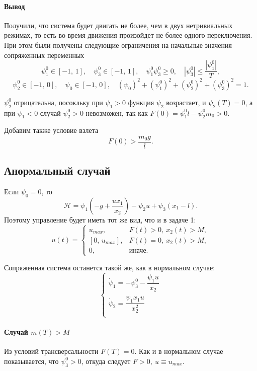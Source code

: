 \documentclass[16pt]{article}
\begin{document}
\paragraph{Вывод} Получили, что система будет двигать не более, чем в двух нетривиальных режимах, то есть
во время движения произойдет не более одного переключения. При этом были получены следующие ограничения на
начальные значения сопряженных переменных
\begin{equation} \label{restr}
\psi_1^0 \in [-1,\, 1], \quad \psi_3^0 \in [-1,\,1],\quad \psi_1^0\psi_3^0 \geqslant 0, 
\quad |\psi_3^0| \leqslant \dfrac{|\psi_1^0|}{T},
\end{equation}
$$\psi_2^0 \in [-1,\, 0], \quad \psi_0 \in [-1,\,0], \quad(\psi_0)^2 + (\psi_1^0)^2 + (\psi_2^0)^2 + (\psi_3^0)^2=1.$$

$\psi_2^0$ отрицательна, посокльку при $\psi_1 > 0$ функция $\psi_2$ возрастает, и $\psi_2(T) = 0$, а при
$\psi_1 < 0$ случай $\psi_2^0 > 0$ невозможен, так как $F(0) = \psi_1^0l - \psi_2^0m_0 > 0$.

Добавим также условие взлета
$$F(0) > \dfrac{m_0g}{l}.$$
\subsection{Анормальный случай}
Если $\psi_0 = 0$, то
$$\mathcal{H} = \psi_1(-g + \dfrac{ux_1}{x_2}) - \psi_2u + \psi_3(x_1-l).$$
Поэтому управление будет иметь тот же вид, что и в задаче 1:
 \begin{equation} \label{oc_1}
 u(t) = 
 \begin{cases}
 u_{max}, & F(t) > 0,\  x_2(t) > M, \\
 [0,\, u_{max}], & F(t) = 0, \ x_2(t) > M, \\
 0, &\text{иначе.}
 \end{cases}
 \end{equation}

Сопряженная система останется такой же, как в нормальном случае:
\begin{equation}
\begin{cases} 
\dot{\psi}_1 = -\psi_3^0 -\dfrac{\psi_1u}{x_2}\\
\dot{\psi}_2 = \dfrac{\psi_1 x_1 u}{x_2^2} \\
\end{cases}
\end{equation}

\paragraph{Случай $m(T) > M$}
Из условий трансверсальности $F(T) = 0$. Как и в нормальном случае показывается, что $\psi_3^0 > 0$, откуда следует
$F > 0, \ u \equiv u_{max}$.
\end{document}
